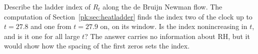 \begin{problem}\label{pk:prob:ladder}
Describe the ladder index of $R_t$ along the de Bruijn Newman flow. The computation of Section~\ref{pk:sec:heatladder} finds the index two of the clock up to $t=27.8$ and one from $t=27.9$ on, on its window. Is the index nonincreasing in $t$, and is it one for all large $t$? The answer carries no information about RH, but it would show how the spacing of the first zeros sets the index.
\end{problem}
